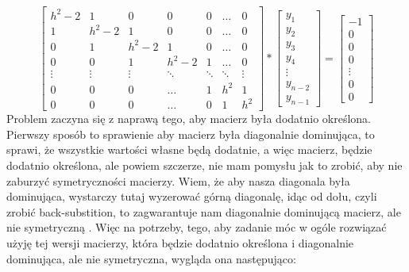 \documentclass[12pt]{article}
\begin{document}
\[
\begin{bmatrix}
    h^{2}-2 & 1 & 0 & 0 & 0 & \dots & 0\\
    1 & h^{2}-2 & 1 & 0 & 0 & \dots & 0\\ 
    0 & 1 & h^{2}-2 & 1 & 0 & \dots & 0\\
    0 & 0 & 1 & h^{2}-2 & 1 &\dots & 0\\
    \vdots & \vdots & \vdots & \ddots & \ddots & \ddots & \vdots\\
    0 & 0 & 0 & \hdots & 1 & h^{2} & 1\\
    0 & 0 & 0 & \hdots & 0 & 1 & h^{2}
\end{bmatrix}
*
\begin{bmatrix}
    y_{1}\\
    y_{2}\\
    y_{3}\\
    y_{4}\\
    \vdots\\
    y_{n-2}\\
    y_{n-1}
\end{bmatrix}
=
\begin{bmatrix}
    -1\\
    0\\
    0\\
    0\\
    \vdots\\
    0\\
    0
\end{bmatrix}
\]
Problem zaczyna się z naprawą tego, aby macierz była dodatnio określona. Pierwszy sposób to sprawienie aby macierz była diagonalnie dominująca, to sprawi, że wszystkie wartości własne będą dodatnie, a więc macierz, będzie dodatnio określona, ale powiem szczerze, nie mam pomysłu jak to zrobić, aby nie zaburzyć symetryczności macierzy. Wiem, że aby nasza diagonala była dominująca, wystarczy tutaj wyzerować górną diagonalę, idąc od dołu, czyli zrobić back-substition, to zagwarantuje nam diagonalnie dominującą macierz, ale nie symetryczną . Więc na potrzeby, tego, aby zadanie móc w ogóle rozwiązać użyję tej wersji macierzy, która będzie dodatnio określona i diagonalnie dominująca, ale nie symetryczna, wygląda ona następująco:
\end{document}
